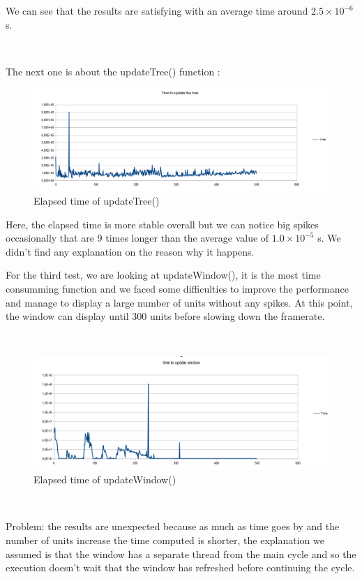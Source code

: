 \documentclass[a4paper,10pt]{book}
\begin{document}
We can see that the results are satisfying with an average time around $2.5\times10^{-6}$ s.

~

The next one is about the updateTree() function :

\begin{figure}[h]
 \includegraphics[scale=0.5]{updateTree}
 \caption{Elapsed time of updateTree()}
\end{figure}
Here, the elapsed time is more stable overall but we can notice big spikes occasionally that are 9 times longer than the average value of $1.0\times10^{-5}$ s. We didn't find any explanation on the reason why it happens.

\newpage

For the third test, we are looking at updateWindow(), it is the most time consumming function and we faced some difficulties to improve the performance and manage to display a large number of units without any spikes. At this point, the window can display until 300 units before slowing down the framerate.

~

\begin{figure}[h]
 \includegraphics[scale=0.5]{updateWindow}
 \caption{Elapsed time of updateWindow()}
\end{figure}

~

Problem: the results are unexpected because as much as time goes by and the number of units increase the time computed is shorter, the explanation we assumed is that the window has a separate thread from the main cycle and so the execution doesn't wait that the window has refreshed before continuing the cycle.
\end{document}
